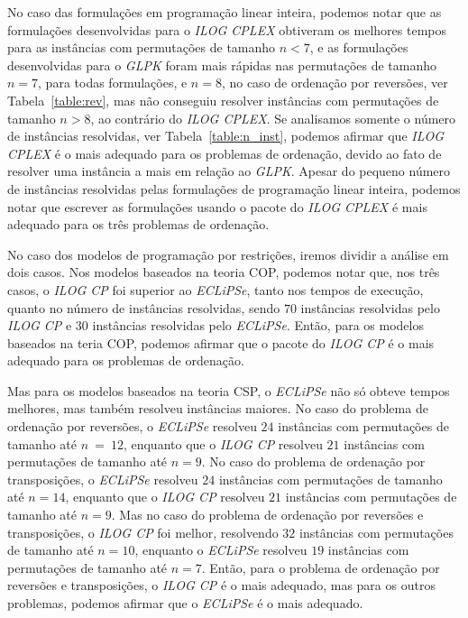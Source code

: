 No caso das formulações em programação linear inteira, podemos notar que
as formulações desenvolvidas para o \textit{ILOG CPLEX} obtiveram os
melhores tempos para as instâncias com permutações de tamanho $n < 7$, e
as formulações desenvolvidas para o \textit{GLPK} foram mais rápidas nas
permutações de tamanho $n = 7$, para todas formulações, e $n = 8$, no
caso de ordenação por reversões, ver Tabela~\ref{table:rev}, mas não
conseguiu resolver instâncias com permutações de tamanho $n > 8$, ao
contrário do \textit{ILOG CPLEX}.  Se analisamos somente o número de
instâncias resolvidas, ver Tabela~\ref{table:n_inst}, podemos afirmar
que \textit{ILOG CPLEX} é o mais adequado para os problemas de
ordenação, devido ao fato de resolver uma instância a mais em relação ao
\textit{GLPK}. Apesar do pequeno número de instâncias resolvidas pelas
formulações de programação linear inteira, podemos notar que escrever as
formulações usando o pacote do \textit{ILOG CPLEX} é mais adequado para
os três problemas de ordenação.

No caso dos modelos de programação por restrições, iremos dividir a
análise em dois casos. Nos modelos baseados na teoria COP, podemos notar
que, nos três casos, o \textit{ILOG CP} foi superior ao
\textit{ECLiPSe}, tanto nos tempos de execução, quanto no número de
instâncias resolvidas, sendo $70$ instâncias resolvidas pelo
\textit{ILOG CP} e $30$ instâncias resolvidas pelo \textit{ECLiPSe}.
Então, para os modelos baseados na teria COP, podemos afirmar que o
pacote do \textit{ILOG CP} é o mais adequado para os problemas de
ordenação.

Mas para os modelos baseados na teoria CSP, o \textit{ECLiPSe} não só
obteve tempos melhores, mas também resolveu instâncias maiores. No caso
do problema de ordenação por reversões, o \textit{ECLiPSe} resolveu $24$
instâncias com permutações de tamanho até $n~=~12$, enquanto que o
\textit{ILOG CP} resolveu $21$ instâncias com permutações de tamanho até
$n = 9$. No caso do problema de ordenação por transposições, o
\textit{ECLiPSe} resolveu $24$ instâncias com permutações de tamanho até
$n = 14$, enquanto que o \textit{ILOG CP} resolveu $21$ instâncias com
permutações de tamanho até $n = 9$. Mas no caso do problema de ordenação
por reversões e transposições, o \textit{ILOG CP} foi melhor, resolvendo
$32$ instâncias com permutações de tamanho até $n = 10$, enquanto o
\textit{ECLiPSe} resolveu $19$ instâncias com permutações de tamanho até
$n = 7$.  Então, para o problema de ordenação por reversões e
transposições, o \textit{ILOG CP} é o mais adequado, mas para os outros
problemas, podemos afirmar que o \textit{ECLiPSe} é o mais adequado.

